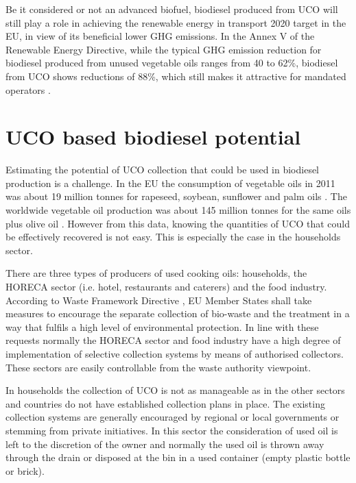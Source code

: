 \documentclass[sustainability,article,submit,moreauthors,pdftex,12pt,a4paper]{mdpi}
\begin{document}
Be it considered or not an advanced biofuel, biodiesel produced from UCO will still play a role in achieving the renewable energy in transport 2020 target in the EU, in view of its beneficial lower GHG emissions. In the Annex V of the Renewable Energy Directive, while the typical GHG emission reduction for biodiesel produced from unused vegetable oils ranges from 40 to 62\%, biodiesel from UCO shows reductions of 88\%, which still makes it attractive for mandated operators \cite{Directive2009/28/EC}.


\section{UCO based biodiesel potential}

Estimating the potential of UCO collection that could be used in biodiesel production is a challenge. In the EU the consumption of vegetable oils in 2011 was about 19 million tonnes for rapeseed, soybean, sunflower and palm oils \cite{Fediol2013}. The worldwide vegetable oil production was about 145 million tonnes for the same oils plus olive oil \cite{USDAonline}. However from this data, knowing the quantities of UCO that could be effectively recovered is not easy. This is especially the case in the households sector.

There are three types of producers of used cooking oils: households, the HORECA sector (i.e. hotel, restaurants and caterers) and the food industry. According to Waste Framework Directive \cite{Directive2008/98/EC}, EU Member States shall take measures to encourage the separate collection of bio-waste and the treatment in a way that fulfils a high level of environmental protection. In line with these requests normally the HORECA sector and food industry have a high degree of implementation of selective collection systems by means of authorised collectors. These sectors are easily controllable from the waste authority viewpoint.

In households the collection of UCO is not as manageable as in the other sectors and countries do not have established collection plans in place. The existing collection systems are generally encouraged by regional or local governments or stemming from private initiatives. In this sector the consideration of used oil is left to the discretion of the owner and normally the used oil is thrown away through the drain or disposed at the bin in a used container (empty plastic bottle or brick).
\end{document}
